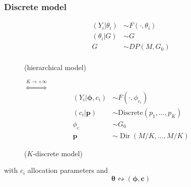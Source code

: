 \begin{frame} %
	\frametitle{Discrete model}
	\begin{figure}[htpb] 
    	    \begin{align*}
  	 		    (Y_{i}|\theta_{i})&\sim F(\cdot,\theta_i) \\
    	        (\theta_{i}|G)&\sim G \\
            	G & \sim DP(M,G_{0}) \\
      		\end{align*}
        	\begin{center}
        		(hierarchical model)
        	\end{center}
		\endminipage 
			$\stackrel{K\to+\infty}{\iff}$
		\endminipage
        	\begin{align*}
            	(Y_{i}|\mathbf{\phi},c_{i})&\sim F(\cdot,\phi_{c_{i}}) \\
            	(c_{i}|\mathit{\mathbf{p}})&\sim \text{Discrete}(\mathit{p_{1}},\dots,\mathit{p_{K}})\\
            	\phi_{c} & \sim G_{0} \\
            	\mathbf{p} &\sim \operatorname{Dir}(M/K,\dots,M/K)
        	\end{align*}
        	\begin{center}
        		($K$-discrete model)
        	\end{center}
		\endminipage  
	\end{figure}
	\begin{center}
		\vspace{20pt}
		with $c_i$ allocation parameters and
		$$\boldsymbol\theta \leftrightsquigarrow (\boldsymbol\phi, \mathbf c)$$
	\end{center}
\end{frame}




